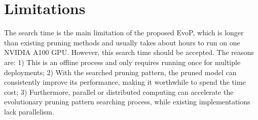 \section{Limitations}

The search time is the main limitation of the proposed EvoP, which is longer than existing pruning methods and usually takes about hours to run on one NVIDIA A100 GPU.
However, this search time should be accepted.
The reasons are: 
1) This is an offline process and only requires running once for multiple deployments; 
2) With the searched pruning pattern, the pruned model can consistently improve its performance, making it worthwhile to spend the time cost;
3) Furthermore, parallel or distributed computing can accelerate the evolutionary pruning pattern searching process, while existing implementations lack parallelism.